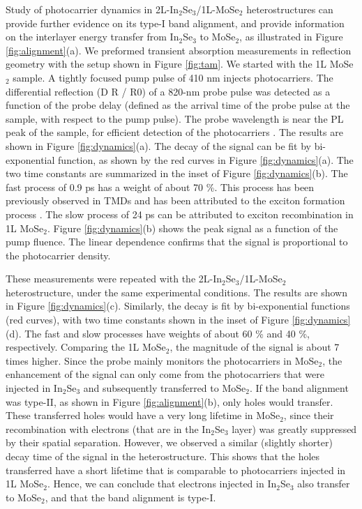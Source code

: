 \documentclass[journal=jacsat,manuscript=article]{achemso}
\begin{document}
Study of photocarrier dynamics in 2L-In$_2$Se$_3$/1L-MoSe$_2$ heterostructures can provide further evidence on its type-I band alignment, and provide information on the interlayer energy transfer from In$_2$Se$_3$ to MoSe$_2$, as illustrated in Figure \ref{fig:alignment}(a). We preformed transient absorption measurements in reflection geometry with the setup shown in Figure \ref{fig:tam}. We started with the 1L MoSe$_2$ sample. A tightly focused pump pulse of 410 nm injects photocarriers. The differential reflection (D R / R0) of a 820-nm probe pulse was detected as a function of the probe delay (defined as the arrival time of the probe pulse at the sample, with respect to the pump pulse). The probe wavelength is near the PL peak of the sample, for efficient detection of the photocarriers \cite{afm271604509}.  The results are shown in Figure \ref{fig:dynamics}(a). The decay of the signal can be fit by bi-exponential function, as shown by the red curves in Figure \ref{fig:dynamics}(a). The two time constants are summarized in the inset of Figure \ref{fig:dynamics}(b).  The fast process of 0.9 ps has a weight of about 70 \%. This process has been previously observed in TMDs and has been attributed to the exciton formation process \cite{nanoscale811681,jap120124306,nl171455}. The slow process of 24 ps can be attributed to exciton recombination in 1L MoSe$_2$. Figure \ref{fig:dynamics}(b) shows the peak signal as a function of the pump fluence. The linear dependence confirms that the signal is proportional to the photocarrier density.

These measurements were repeated with the 2L-In$_2$Se$_3$/1L-MoSe$_2$ heterostructure, under the same experimental conditions. The results are shown in Figure \ref{fig:dynamics}(c). Similarly, the decay is fit by bi-exponential functions (red curves), with two time constants shown in the inset of Figure \ref{fig:dynamics}(d). The fast and slow processes have weights of about 60 \% and 40 \%, respectively. Comparing the 1L MoSe$_2$, the magnitude of the signal is about 7 times higher. Since the probe mainly monitors the photocarriers in MoSe$_2$, the enhancement of the signal can only come from the photocarriers that were injected in In$_2$Se$_3$ and subsequently transferred to MoSe$_2$. If the band alignment was type-II, as shown in Figure \ref{fig:alignment}(b), only holes would transfer. These transferred holes would have a very long lifetime in MoSe$_2$, since their recombination with electrons (that are in the In$_2$Se$_3$ layer) was greatly suppressed by their spatial separation. However, we observed a similar (slightly shorter) decay time of the signal in the heterostructure. This shows that the holes transferred have a short lifetime that is comparable to photocarriers injected in 1L MoSe$_2$. Hence, we can conclude that electrons injected in In$_2$Se$_3$ also transfer to MoSe$_2$, and that the band alignment is type-I.
\end{document}
